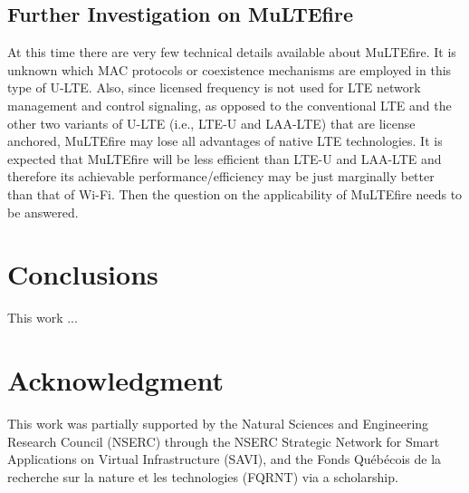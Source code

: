 \documentclass[12pt,onecolumn]{article}
\begin{document}
\subsection{Further Investigation on MuLTEfire}

At this time there are very few technical details available about MuLTEfire. It is unknown which MAC protocols or coexistence mechanisms are employed in this type of U-LTE. Also, since licensed frequency is not used for LTE network management and control signaling, as opposed to the conventional LTE and the other two variants of U-LTE (i.e., LTE-U and LAA-LTE) that are license anchored, MuLTEfire may lose all advantages of native LTE technologies. It is expected that MuLTEfire will be less efficient than LTE-U and LAA-LTE and therefore its achievable performance/efficiency may be just marginally better than that of Wi-Fi. Then the question on the applicability of MuLTEfire needs to be answered.


\section{Conclusions}
\label{sec:conclusions}

\noindent This work ...



\section*{Acknowledgment}

{\small
\noindent This work was partially supported by the Natural Sciences and Engineering Research Council (NSERC) through the NSERC Strategic Network for Smart Applications on Virtual Infrastructure (SAVI), and the Fonds Qu\'{e}b\'{e}cois de la recherche sur la nature et les technologies (FQRNT) via a scholarship.
}






\vfill{}
\end{document}
